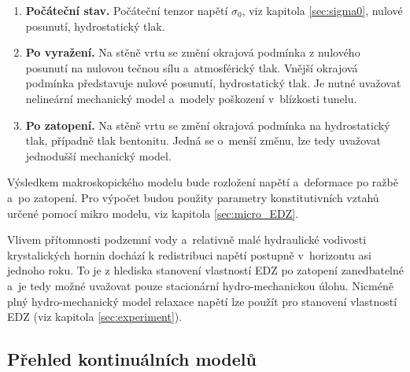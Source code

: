 \documentclass{article}
\begin{document}
\begin{enumerate}
\item {\bf Počáteční stav.} Počáteční tenzor napětí $\sigma_0$, viz kapitola \ref{sec:sigma0}, nulové posunutí, hydrostatický tlak.
                       
\item {\bf Po vyražení.} Na stěně vrtu se změní okrajová podmínka z nulového posunutí na nulovou tečnou sílu
                         a~atmosférický tlak. Vnější okrajová podmínka představuje nulové posunutí, hydrostatický tlak.
                         Je nutné uvažovat nelineární mechanický model a~modely poškození v~blízkosti tunelu.                    
                         
\item {\bf Po zatopení.} Na stěně vrtu se změní okrajová podmínka na hydrostatický tlak, případně tlak bentonitu. 
                        Jedná se o~menší změnu, lze tedy uvažovat jednodušší mechanický model.
\end{enumerate}

Výsledkem makroskopického modelu bude rozložení napětí a~deformace po ražbě a~po zatopení. Pro výpočet budou použity 
parametry konstitutivních vztahů určené pomocí mikro modelu, viz kapitola \ref{sec:micro_EDZ}. 

Vlivem přítomnosti podzemní vody a~relativně malé hydraulické vodivosti krystalických hornin dochází k redistribuci napětí 
postupně v~horizontu asi jednoho roku. To je z hlediska stanovení vlastností EDZ po zatopení zanedbatelné a~je tedy možné uvažovat 
pouze stacionární hydro-mechanickou úlohu. Nicméně plný hydro-mechanický model relaxace napětí lze použít pro stanovení vlastností EDZ (viz kapitola \ref{sec:experiment}).







\subsection{Přehled kontinuálních modelů} 
\end{document}
